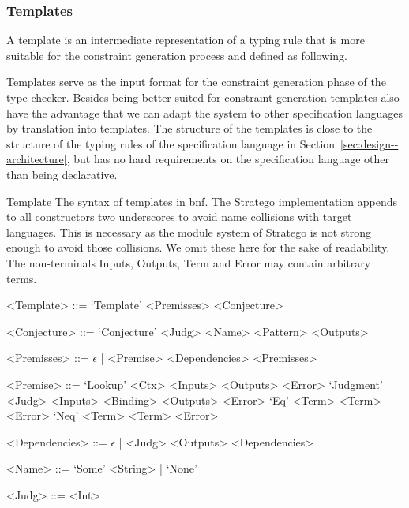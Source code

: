 \subsubsection{Templates}
A template is an intermediate representation of a typing rule that is
more suitable for the constraint generation process and defined as
following.

Templates serve as the input format for the constraint generation
phase of the type checker. Besides being better suited for constraint
generation templates also have the advantage that we can adapt the
system to other specification languages by translation into
templates. The structure of the templates is close to the structure of
the typing rules of the specification language in
Section~\ref{sec:design--architecture}, but has no hard requirements
on the specification language other than being declarative.

\begin{definition}{Template}
   The syntax of templates in \gls{bnf}. The
  Stratego implementation appends to all constructors two underscores
  to avoid name collisions with target languages. This is necessary as
  the module system of Stratego is not strong enough to avoid those
  collisions. We omit these here for the sake of readability. The
  non-terminals Inputs, Outputs, Term and Error may contain arbitrary
  terms.
  \begin{grammar}
    <Template> ::= `Template' <Premisses> <Conjecture>

    <Conjecture> ::= `Conjecture' <Judg> <Name> <Pattern> <Outputs>

    <Premisses> ::= $\epsilon$ | <Premise> <Dependencies> <Premisses>

    <Premise> ::= `Lookup' <Ctx> <Inputs> <Outputs> <Error>
    \alt `Judgment' <Judg> <Inputs> <Binding> <Outputs> <Error>
    \alt `Eq' <Term> <Term> <Error>
    \alt `Neq' <Term> <Term> <Error>

    <Dependencies> ::= $\epsilon$ | <Judg> <Outputs> <Dependencies>

    <Name> ::= `Some' <String> | `None'

    <Judg> ::= <Int>
  \end{grammar}
\end{definition}

